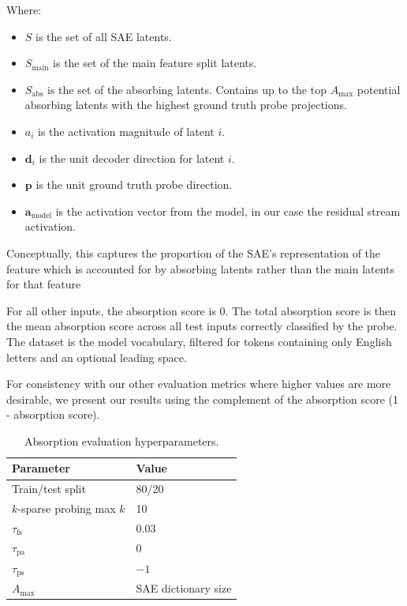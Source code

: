 \documentclass{article}
\theoremstyle{plain}
\theoremstyle{definition}
\theoremstyle{remark}
\begin{document}
Where:
\begin{itemize}
    \item $S$ is the set of all SAE latents.
    \item $S_\text{main}$ is the set of the main feature split latents.
    \item $S_\text{abs}$ is the set of the absorbing latents. Contains up to the top $A_{\max}$ potential absorbing latents with the highest ground truth probe projections.
    \item $a_i$ is the activation magnitude of latent $i$.
    \item $\mathbf{d}_i$ is the unit decoder direction for latent $i$.
    \item $\mathbf{p}$ is the unit ground truth probe direction.
    \item $\mathbf{a}_\text{model}$ is the activation vector from the model, in our case the residual stream activation.
\end{itemize}

Conceptually, this captures the proportion of the SAE's representation of the feature which is accounted for by absorbing latents rather than the main latents for that feature

For all other inputs, the absorption score is 0. The total absorption score is then the mean absorption score across all test inputs correctly classified by the probe. The dataset is the model vocabulary, filtered for tokens containing only English letters and an optional leading space.

For consistency with our other evaluation metrics where higher values are more desirable, we present our results using the complement of the absorption score (1 - absorption score).

\begin{table}[h!]
    \centering
    \begin{tabular}{|l|l|}
        \hline
        \textbf{Parameter}             & \textbf{Value}                  \\ \hline
        Train/test split               & 80/20                           \\ \hline
        $k$-sparse probing max $k$     & 10                           \\ \hline
        $\tau_\text{fs}$               & $0.03$                           \\ \hline
        $\tau_{\text{pa}}$             & 0                           \\ \hline
        $\tau_{\text{ps}}$             & $-1$                           \\ \hline
        $A_{\max}$                     & SAE dictionary size                           \\ \hline
    \end{tabular}
    \caption{Absorption evaluation hyperparameters.}
    \label{tab:absorption-parameters}
\end{table}
\end{document}
